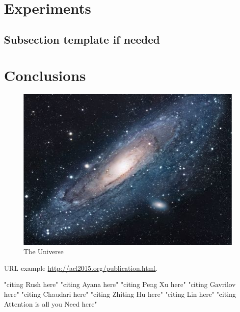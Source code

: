 \documentclass[11pt]{article}
\begin{document}
\section{Experiments}
\subsection{Subsection template if needed}
\section{Conclusions}

\begin{figure}[h!]
\centering
\includegraphics[scale=1.7]{universe}
\caption{The Universe}
\label{fig:universe}
\end{figure}

URL example
\url{http://acl2015.org/publication.html}.

"citing Rush here" \citep{rush2015neural}
"citing Ayana here" \cite{Ayana2017}
"citing Peng Xu here" \cite{DBLP:journals/corr/abs-1902-07110}
"citing Gavrilov here" \cite{DBLP:journals/corr/abs-1901-07786}
"citing Chaudari here" \cite{DBLP:journals/corr/abs-1802-09426}
"citing Zhiting Hu here" \cite{DBLP:journals/corr/HuYLSX17}
"citing Lin here" \cite{lin-2004-rouge}
"citing Attention is all you Need here" \cite{DBLP:journals/corr/VaswaniSPUJGKP17}



\end{document}
